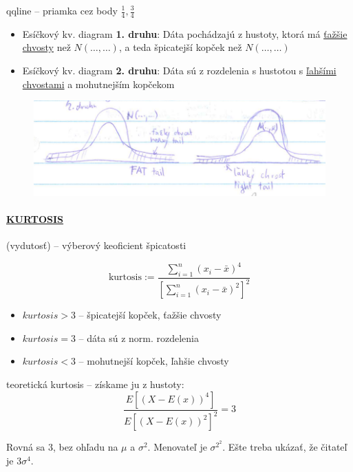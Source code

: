\documentclass[unknownkeysallowed]{article}
\begin{document}
qqline -- priamka cez body $\frac{1}{4}, \frac{3}{4}$

\begin{itemize}
\item Esíčkový kv. diagram \textbf{1. druhu}: Dáta pochádzajú z hustoty, ktorá má \underline{ťažšie chvosty} než $N(\ldots, \ldots)$, a teda špicatejší kopček než $N(\ldots, \ldots)$
\item Esíčkový kv. diagram \textbf{2. druhu}: Dáta sú z rozdelenia s hustotou s \underline{ľahšími chvostami} a mohutnejším kopčekom
\end{itemize}

\begin{figure}[H]
\includegraphics[width=\textwidth]{imgs/obr13.png}
\centering
\end{figure}

\paragraph{\underline{KURTOSIS}} (vydutosť) -- výberový keoficient špicatosti

\begin{equation*}
\mathrm{kurtosis} := \dfrac{\sum\limits_{i=1}^{n}{(x_i-\bar{x})^4}}{\left[\sum\limits_{i=1}^{n}{(x_i-\bar{x})^2}\right]^{2}}
\end{equation*}

\begin{itemize}
\item $kurtosis>3$ -- špicatejší kopček, ťažšie chvosty
\item $kurtosis=3$ -- dáta sú z norm. rozdelenia
\item $kurtosis<3$ -- mohutnejší kopček, ľahšie chvosty
\end{itemize}

teoretická kurtosis -- získame ju z hustoty:
\begin{equation*}
\dfrac{E[(X-E(x))^4]}{E[(X-E(x))^2]^2} = 3
\end{equation*}

Rovná sa 3, bez ohľadu na $\mu$ a $\sigma^2$. Menovateľ je $\sigma^{2^2}$. Ešte treba ukázať, že čitateľ je $3\sigma^4$.
\end{document}
